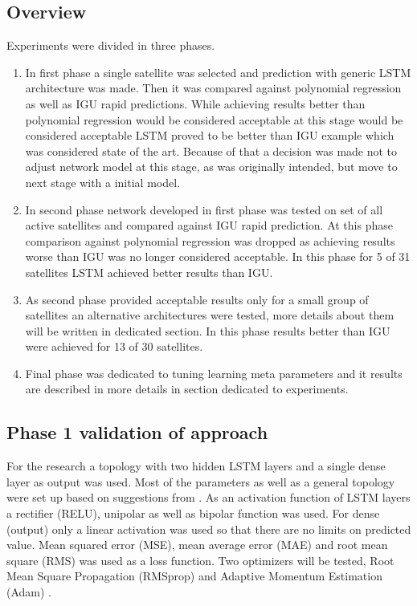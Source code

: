 \documentclass{article}
\begin{document}
\subsection{Overview}
Experiments were divided in three phases.
\begin{enumerate}
\item In first phase a single satellite was selected and prediction with generic LSTM architecture
	was made. Then it was compared against polynomial regression as well as IGU rapid predictions.
	While achieving results better than polynomial regression would be considered acceptable at 
	this stage would be considered acceptable LSTM proved to be better than IGU example which
	was considered state of the art. Because of that a decision was made not to adjust network
	model at this stage, as was originally intended, but move to next stage with a initial model.

\item In second phase network developed in first phase was tested on set of all active 
	satellites and compared against IGU rapid prediction. At this phase comparison against 
	polynomial regression was dropped as achieving results worse than IGU was no longer 
	considered acceptable. In this phase for 5 of 31 satellites LSTM achieved better 
	results than IGU.

\item As second phase provided acceptable results only for a small group of satellites 
	an alternative architectures were tested, more details about them will be written in 
	dedicated section. In this phase results better than IGU were achieved 
	for 13 of 30 satellites.
\item Final phase was dedicated to tuning learning meta parameters and it results are described
	in more details in section dedicated to experiments.

\end{enumerate}

\subsection{Phase 1 validation of approach}
For the research a topology with two hidden LSTM layers and a single dense layer as output was 
used. 
Most of the parameters as well as a general topology were set up based on suggestions from 
\cite{Chollet2018}. As an activation function of LSTM layers a rectifier (RELU),
unipolar as well as bipolar function was used.
For dense (output) only a linear activation was used so that there are no limits on predicted 
value.
Mean squared error (MSE), mean average error (MAE) and root mean square (RMS)
was used as a loss function.
Two optimizers will be tested, Root Mean Square Propagation (RMSprop)\cite{Hinton2012} and 
Adaptive Momentum Estimation (Adam) \cite{Kingma2015}.
\end{document}
